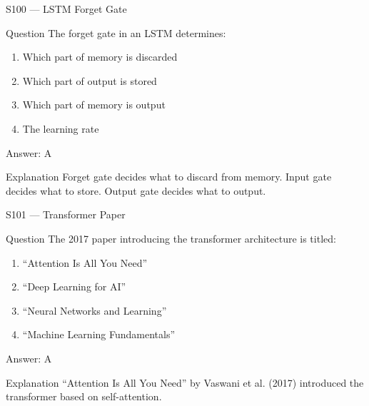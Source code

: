 \documentclass[aspectratio=169,8pt]{beamer}
\begin{document}
	\begin{frame}{S100 --- LSTM Forget Gate}
		\begin{block}{Question}
			The forget gate in an LSTM determines:
			\begin{enumerate}
				\item Which part of memory is discarded
				\item Which part of output is stored
				\item Which part of memory is output
				\item The learning rate
			\end{enumerate}
		\end{block}
		\begin{exampleblock}{Answer: A}\end{exampleblock}
		\begin{block}{Explanation}
			Forget gate decides what to discard from memory. Input gate decides what to store. Output gate decides what to output.
		\end{block}
	\end{frame}
	
	\begin{frame}{S101 --- Transformer Paper}
		\begin{block}{Question}
			The 2017 paper introducing the transformer architecture is titled:
			\begin{enumerate}
				\item ``Attention Is All You Need''
				\item ``Deep Learning for AI''
				\item ``Neural Networks and Learning''
				\item ``Machine Learning Fundamentals''
			\end{enumerate}
		\end{block}
		\begin{exampleblock}{Answer: A}\end{exampleblock}
		\begin{block}{Explanation}
			``Attention Is All You Need'' by Vaswani et al. (2017) introduced the transformer based on self-attention.
		\end{block}
	\end{frame}
	
\end{document}
